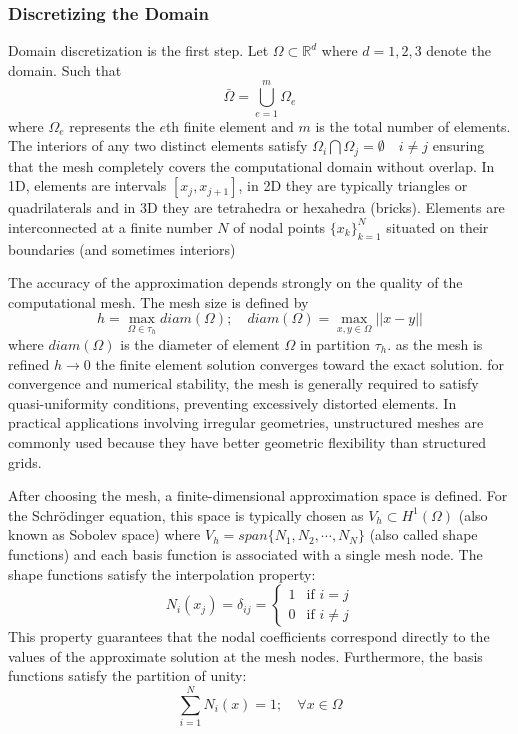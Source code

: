 \documentclass[11pt]{article}
\begin{document}
\subsubsection{Discretizing the Domain}
Domain discretization is the first step. Let $\Omega \subset \mathbb{R}^d$ where $d=1,2,3$ denote the domain. Such that
\begin{equation}
	\bar{\Omega} = \bigcup_{e=1}^{m} \Omega_e
\end{equation}
where $\Omega_e$ represents the $e$th finite element and $m$ is the total number of elements. The interiors of any two distinct elements satisfy $\Omega_i \bigcap \Omega_j = \emptyset \quad i \neq j$ ensuring that the mesh completely covers the computational domain without overlap.  In 1D, elements are intervals $[ x_j, x_{j+1}]$, in 2D they are typically triangles or quadrilaterals and in 3D they are tetrahedra or hexahedra (bricks). Elements are interconnected at a finite number $N$ of nodal points $ \{ x_k \}_{k = 1}^N$ situated on their boundaries (and sometimes interiors)

The accuracy of the approximation depends strongly on the quality of the computational mesh. The mesh size is defined by 
\begin{equation}
	h = \max_{\Omega \in \tau_h} diam(\Omega) ; \quad diam(\Omega) = \max_{x,y \in \Omega} || x - y ||
\end{equation}
where $diam(\Omega)$ is the diameter  of element $\Omega$ in partition $\tau_h$. as the mesh is refined $h \to 0$ the finite element solution converges toward the exact solution. for convergence and numerical stability, the mesh is generally required to satisfy quasi-uniformity conditions, preventing excessively distorted elements. In practical applications involving irregular geometries, unstructured meshes are commonly used because they have better geometric flexibility than structured grids.

After choosing the mesh, a finite-dimensional approximation space is defined. For the Schrödinger equation, this space is typically chosen as $V_h \subset H^1 (\Omega)$ (also known as Sobolev space) where $V_h = span \{ N_1, N_2, \cdots , N_N \}$ (also called shape functions) and each basis function is associated with a single mesh node.
The shape functions satisfy the interpolation property:
\begin{equation}
	N_i (x_j) = \delta_{ij} = 
		\begin{cases} 
		1 & \text{if } i = j \\
		0 & \text{if } i \neq j 
	\end{cases}
\end{equation}
This property guarantees that the nodal coefficients correspond directly to the values of the approximate solution at the mesh nodes. Furthermore, the basis functions satisfy the partition of unity:
\begin{equation}
	\sum_{i=1}^N N_i(x) = 1 ; \quad \forall x \in \Omega
\end{equation}
\end{document}
